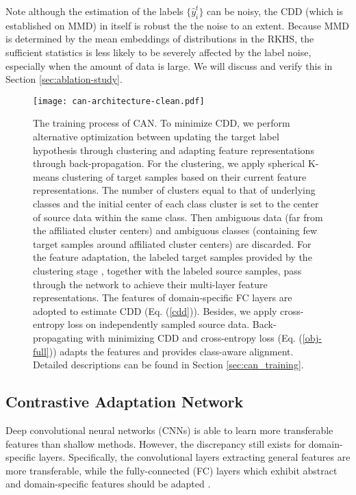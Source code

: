\documentclass[10pt,twocolumn,letterpaper]{article}
\begin{document}
Note although the estimation of the labels $\{\hat{y}^t_i\}$ can be noisy,
the CDD (which is established on MMD) in itself is robust the the noise to an extent.
Because MMD is determined by the mean embeddings of distributions in the RKHS, 
the sufficient statistics is less likely to be severely affected by the label noise, 
especially when the amount of data is large.
We will discuss and verify this in Section \ref{sec:ablation-study}.





\begin{figure*}[t]
\begin{center}
\texttt{[image: can-architecture-clean.pdf]}
\end{center}
\vspace{-3mm}
\caption{\label{fig:framework}
The training process of CAN. To minimize CDD, we perform alternative optimization 
between updating the target label hypothesis through clustering and 
adapting feature representations through back-propagation. 
For the clustering, we apply spherical K-means clustering of target samples
based on their current feature representations.
The number of clusters equal to that of underlying classes and 
the initial center of each class cluster is set to the center of source data
within the same class.
Then ambiguous data (\ie far from the affiliated cluster centers) and 
ambiguous classes (\ie containing few target samples around affiliated cluster centers) 
are discarded.
For the feature adaptation, the labeled target samples provided by the clustering stage
, together with the labeled source samples, pass through the network
to achieve their multi-layer feature representations. 
The features of domain-specific FC layers are adopted to estimate CDD (Eq. (\ref{cdd})).
Besides, we apply cross-entropy loss on independently sampled source data.
Back-propagating with minimizing CDD and cross-entropy loss (Eq. (\ref{obj-full})) adapts the
features and provides class-aware alignment.
Detailed descriptions can be found in Section \ref{sec:can_training}.}
\vspace{-3mm}
\end{figure*}
\subsection{Contrastive Adaptation Network}\label{sec:can}
Deep convolutional neural networks (CNNs) is able to learn more transferable features than shallow methods. 
However, the discrepancy still exists for domain-specific layers.
Specifically, the convolutional layers extracting general features are more transferable, 
while the fully-connected (FC) layers which exhibit abstract and domain-specific features should be adapted \cite{long2015learning,long2017deep}. 
\end{document}

